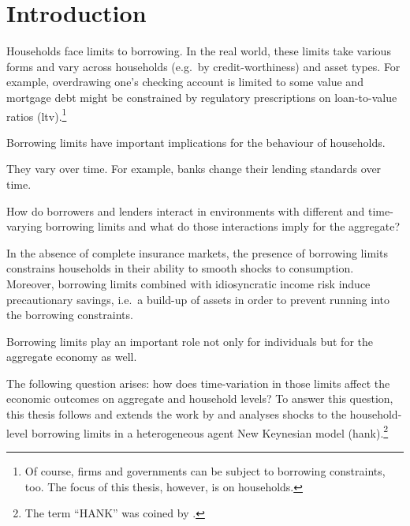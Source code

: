 \documentclass[12pt]{article} %
\numberwithin{equation}{section} %
\begin{document}
\newpage
{} %
\pagestyle{fancy}
\fancyhf{}
\fancyhead[C]{\leftmark}
\fancyfoot[C]{\thepage}

\thispagestyle{plain}
\section{Introduction}
\label{sec:introduction}

Households face limits to borrowing. In the real world, these limits take various forms and vary across households (e.g.~by credit-worthiness) and asset types. For example, overdrawing one's checking account is limited to some value and mortgage debt might be constrained by regulatory prescriptions on loan-to-value ratios (\Gls{ltv}).\footnote{Of course, firms and governments can be subject to borrowing constraints, too. The focus of this thesis, however, is on households.}

Borrowing limits have important implications for the behaviour of households.

They vary over time. For example, banks change their lending standards over time.

How do borrowers and lenders interact in environments with different and time-varying borrowing limits and what do those interactions imply for the aggregate?

In the absence of complete insurance markets, the presence of borrowing limits constrains households in their ability to smooth shocks to consumption. Moreover, borrowing limits combined with idiosyncratic income risk induce precautionary savings, i.e.~a build-up of assets in order to prevent running into the borrowing constraints. 

Borrowing limits play an important role not only for individuals but for the aggregate economy as well.

The following question arises: how does time-variation in those limits affect the economic outcomes on aggregate and household levels? To answer this question, this thesis follows and extends the work by \textcite{gl2017} and analyses shocks to the household-level borrowing limits in a heterogeneous agent New Keynesian model (\Gls{hank}).\footnote{The term \enquote{HANK} was coined by \textcite{kaplan2018}.}
\end{document}
